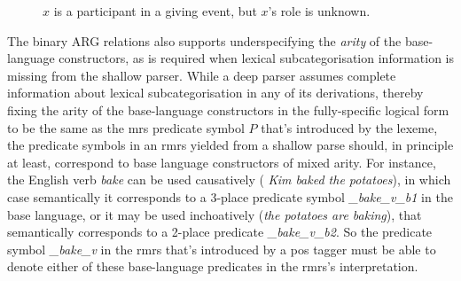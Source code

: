 \begin{figure}

\leaf{$\ldots$}
\leaf{$\ldots$}
\tree
\hfill
{}
\leaf{$\ldots$}
\leaf{$\ldots$}
\tree

\caption{$x$ is a participant in a
  giving event, but $x$'s role is unknown.}
\label{fig:2}
\end{figure}

The binary ARG relations also supports underspecifying the {\em arity}
of the base-language constructors, as is required when lexical
subcategorisation information is missing from the shallow parser.
While a deep parser assumes complete information about lexical
subcategorisation in any of its derivations, thereby fixing the arity
of the base-language constructors in the fully-specific logical form
to be the same as the {\sc mrs} predicate symbol $P$ that's introduced by
the lexeme, the predicate symbols in an {\sc rmrs} yielded from a
shallow parse should, in principle at least,
correspond to base language constructors of mixed arity.  For
instance, the English verb {\em bake} can be used causatively ({\em
  Kim baked the potatoes}), in which case semantically it corresponds
to a 3-place predicate symbol {\em \_bake\_v\_b1} in the base
language, or it may be used 
inchoatively ({\em the potatoes are baking}), that semantically
corresponds to a 2-place predicate {\em \_bake\_v\_b2}.  So the 
predicate symbol {\em 
  \_bake\_v} in the {\sc rmrs} that's introduced by a {\sc pos} tagger
must be able to denote either of these
base-language predicates in the {\sc rmrs}'s interpretation.



